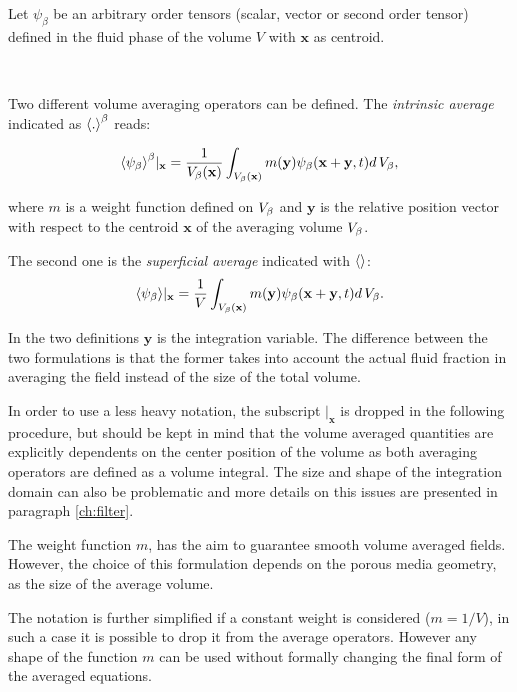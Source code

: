 Let $\psi_{\beta}$ be an arbitrary order tensors (scalar, vector or second order tensor) defined in the fluid phase of the volume $V$ with $\mathbf{x}$ as centroid.

\newpage 

$\quad$

\newpage

Two different volume averaging operators can be defined. The \textit{intrinsic average} indicated as ${\left< . \right>}^{\beta}$ reads:

\begin{equation}
	{\left< \psi_{\beta} \right>}^{\beta}|_{\mathbf{x}} = \dfrac{1}{V_\beta(\mathbf{x})} \int_{V_\beta(\mathbf{x})}  m(\mathbf{y}) \psi_{\beta}(\mathbf{x}+\mathbf{y}, t) d \, V_\beta,
	\label{eq:avg_intrinsic}
\end{equation}

\noindent where $m$ is a weight function defined on $V_\beta$ and $\mathbf{y}$ is the relative position vector with respect to the centroid $\mathbf{x}$ of the averaging volume $V_\beta$.

The second one is the \textit{superficial average} indicated with ${\left<  \right>}$:
\begin{equation}
	{\left< \psi_{\beta} \right>}|_{\mathbf{x}} = \dfrac{1}{V} \int_{V_\beta(\mathbf{x})} m(\mathbf{y}) \psi_{\beta}(\mathbf{x}+\mathbf{y}, t) d \, V_\beta.
	\label{eq:avg_superficial}
\end{equation}

In the two definitions $\mathbf{y}$ is the integration variable.
The difference between the two formulations is that the former takes into account the actual fluid fraction in averaging the field instead of the size of the total volume.

In order to use a less heavy notation, the subscript $|_{\mathbf{x}}$ is dropped in the following procedure, but should be kept in mind that the volume averaged quantities are explicitly dependents on the center position of the volume as both averaging operators are defined as a volume integral.
The size and shape of the integration domain can also be problematic and more details on this issues are presented in paragraph \ref{ch:filter}.

The weight function $m$, has the aim to guarantee smooth volume averaged fields.
However, the choice of this formulation depends on the porous media geometry, as the size of the average volume.

The notation is further simplified if a constant weight is considered ($m=1/V$), in such a case it is possible to drop it from the average operators.
However any shape of the function $m$ can be used without formally changing the final form of the averaged equations.

